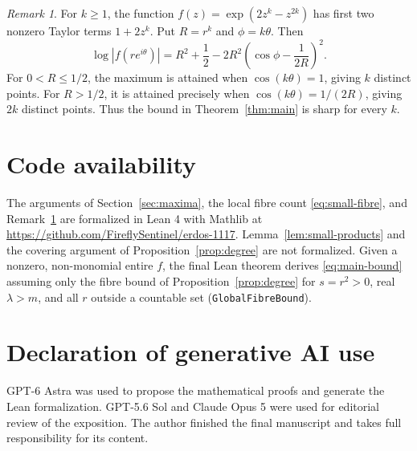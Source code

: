 \documentclass[11pt]{article}
\theoremstyle{remark}
\newtheorem{remark}[theorem]{Remark}
\numberwithin{equation}{section}
\begin{document}
\begin{remark}\label{rem:sharp}
For \(k\ge1\), the function
\(f(z)=\exp(2z^k-z^{2k})\) has first two nonzero Taylor terms
\(1+2z^k\). Put \(R=r^k\) and \(\phi=k\theta\). Then
\[
 \log|f(re^{i\theta})|
 =R^2+\frac12
   -2R^2\left(\cos\phi-\frac1{2R}\right)^2.
\]
For \(0<R\le1/2\), the maximum is attained when
\(\cos(k\theta)=1\), giving \(k\) distinct points. For \(R>1/2\),
it is attained precisely when \(\cos(k\theta)=1/(2R)\), giving
\(2k\) distinct points. Thus the bound in Theorem~\ref{thm:main}
is sharp for every \(k\).
\end{remark}

\section*{Code availability}

The arguments of Section~\ref{sec:maxima}, the local
fibre count \eqref{eq:small-fibre}, and Remark~\ref{rem:sharp} are
formalized in Lean 4 with Mathlib at
\url{https://github.com/FireflySentinel/erdos-1117}.
Lemma~\ref{lem:small-products} and the covering argument of
Proposition~\ref{prop:degree} are not formalized.
Given a nonzero, non-monomial entire \(f\), the final Lean theorem
derives \eqref{eq:main-bound} assuming only the fibre bound of
Proposition~\ref{prop:degree} for \(s=r^2>0\), real \(\lambda>m\),
and all \(r\) outside a countable set (\texttt{GlobalFibreBound}).

\section*{Declaration of generative AI use}

GPT-6 Astra was used to propose the mathematical proofs and generate
the Lean formalization. GPT-5.6 Sol and Claude Opus 5 were used for
editorial review of the exposition. The author finished the final
manuscript and takes full responsibility for its content.
\end{document}
